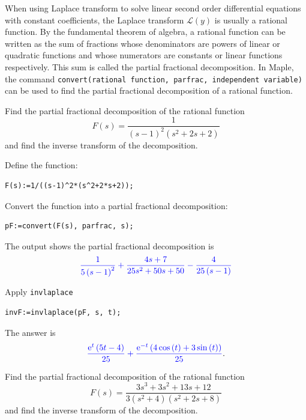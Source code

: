 \documentclass[
  12pt]{elegantbook}
\begin{document}
When using Laplace transform to solve linear second order differential equations with constant coefficients, the Laplace transform \(\mathcal{L}(y)\) is usually a rational function. By the fundamental theorem of algebra, a rational function can be written as the sum of fractions whose denominators are powers of linear or quadratic functions and whose numerators are constants or linear functions respectively. This sum is called the partial fractional decomposition. In Maple, the command \texttt{convert(rational\ function,\ parfrac,\ independent\ variable)} can be used to find the partial fractional decomposition of a rational function.

\begin{example}
Find the partial fractional decomposition of the rational function
\[F(s)=\frac{1}{(s-1)^2(s^2+2s+2)}\]
and find the inverse transform of the decomposition.
\end{example}

\begin{solution}
Define the function:

\begin{verbatim}
F(s):=1/((s-1)^2*(s^2+2*s+2));
\end{verbatim}

Convert the function into a partial fractional decomposition:

\begin{verbatim}
pF:=convert(F(s), parfrac, s);
\end{verbatim}

The output shows the partial fractional decomposition is
\[{\color{blue}{\frac{1}{5 \left(s -1\right)^{2}}+\frac{4 s +7}{25 s^{2}+50 s +50}-\frac{4}{25 \left(s -1\right)}}}\]

Apply \texttt{invlaplace}

\begin{verbatim}
invF:=invlaplace(pF, s, t);
\end{verbatim}

The answer is
\[{\color{blue}{\frac{{\mathrm e}^{t} \left(5 t -4\right)}{25}+\frac{{\mathrm e}^{-t} \left(4 \cos \left(t \right)+3 \sin \left(t \right)\right)}{25}}}.\]
\end{solution}

\begin{exercise}
Find the partial fractional decomposition of the rational function
\[F(s)=\frac{3 s^{3}+3 s^{2}+13 s +12}{3 \left(s^{2}+4\right) \left(s^{2}+2 s +8\right)}\]
and find the inverse transform of the decomposition.
\end{exercise}
\end{document}

